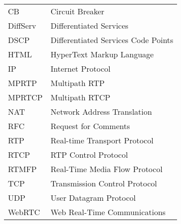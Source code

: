 \begin{longtable}{ll}
CB		& Circuit Breaker \\
DiffServ	& Differentiated Services \\
DSCP 	& Differentiated Services Code Points \\
HTML	& HyperText Markup Language \\
IP		& Internet Protocol \\
MPRTP 	& Multipath RTP \\
MPRTCP 	& Multipath RTCP \\
NAT		& Network Address Translation \\
RFC 	& Request for Comments \\
RTP 	& Real-time Transport Protocol \\
RTCP 	& RTP Control Protocol \\
RTMFP	& Real-Time Media Flow Protocol \\
TCP		& Transmission Control Protocol \\
UDP		& User Datagram Protocol \\
WebRTC 	& Web Real-Time Communications \\
\end{longtable}
